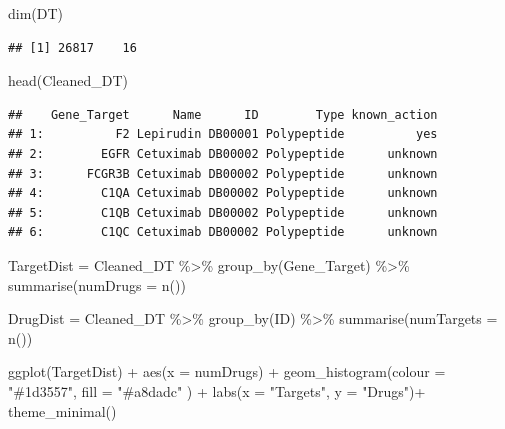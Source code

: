 \documentclass[
]{book}
\newenvironment{Shaded}{\begin{snugshade}}{\end{snugshade}}
\newcommand{\AttributeTok}[1]{\textcolor[rgb]{0.77,0.63,0.00}{#1}}
\newcommand{\FunctionTok}[1]{\textcolor[rgb]{0.00,0.00,0.00}{#1}}
\newcommand{\NormalTok}[1]{#1}
\newcommand{\OtherTok}[1]{\textcolor[rgb]{0.56,0.35,0.01}{#1}}
\newcommand{\SpecialCharTok}[1]{\textcolor[rgb]{0.00,0.00,0.00}{#1}}
\newcommand{\StringTok}[1]{\textcolor[rgb]{0.31,0.60,0.02}{#1}}
\begin{document}
\begin{Shaded}
\begin{Highlighting}[]
\FunctionTok{dim}\NormalTok{(DT)}
\end{Highlighting}
\end{Shaded}

\begin{verbatim}
## [1] 26817    16
\end{verbatim}

\begin{Shaded}
\begin{Highlighting}[]
\FunctionTok{head}\NormalTok{(Cleaned\_DT)}
\end{Highlighting}
\end{Shaded}

\begin{verbatim}
##    Gene_Target      Name      ID        Type known_action
## 1:          F2 Lepirudin DB00001 Polypeptide          yes
## 2:        EGFR Cetuximab DB00002 Polypeptide      unknown
## 3:      FCGR3B Cetuximab DB00002 Polypeptide      unknown
## 4:        C1QA Cetuximab DB00002 Polypeptide      unknown
## 5:        C1QB Cetuximab DB00002 Polypeptide      unknown
## 6:        C1QC Cetuximab DB00002 Polypeptide      unknown
\end{verbatim}

\begin{Shaded}
\begin{Highlighting}[]
\NormalTok{TargetDist }\OtherTok{=}\NormalTok{ Cleaned\_DT }\SpecialCharTok{\%\textgreater{}\%} 
  \FunctionTok{group\_by}\NormalTok{(Gene\_Target) }\SpecialCharTok{\%\textgreater{}\%}
  \FunctionTok{summarise}\NormalTok{(}\AttributeTok{numDrugs =} \FunctionTok{n}\NormalTok{()) }

\NormalTok{DrugDist }\OtherTok{=}\NormalTok{ Cleaned\_DT }\SpecialCharTok{\%\textgreater{}\%} 
  \FunctionTok{group\_by}\NormalTok{(ID) }\SpecialCharTok{\%\textgreater{}\%}
  \FunctionTok{summarise}\NormalTok{(}\AttributeTok{numTargets =} \FunctionTok{n}\NormalTok{()) }
\end{Highlighting}
\end{Shaded}

\begin{Shaded}
\begin{Highlighting}[]
\FunctionTok{ggplot}\NormalTok{(TargetDist) }\SpecialCharTok{+}
  \FunctionTok{aes}\NormalTok{(}\AttributeTok{x =}\NormalTok{ numDrugs) }\SpecialCharTok{+}
  \FunctionTok{geom\_histogram}\NormalTok{(}\AttributeTok{colour =} \StringTok{"\#1d3557"}\NormalTok{, }\AttributeTok{fill =} \StringTok{"\#a8dadc"}\NormalTok{ ) }\SpecialCharTok{+}
  \FunctionTok{labs}\NormalTok{(}\AttributeTok{x =} \StringTok{"Targets"}\NormalTok{, }\AttributeTok{y =} \StringTok{"Drugs"}\NormalTok{)}\SpecialCharTok{+}
  \FunctionTok{theme\_minimal}\NormalTok{()}
\end{Highlighting}
\end{Shaded}
\end{document}
